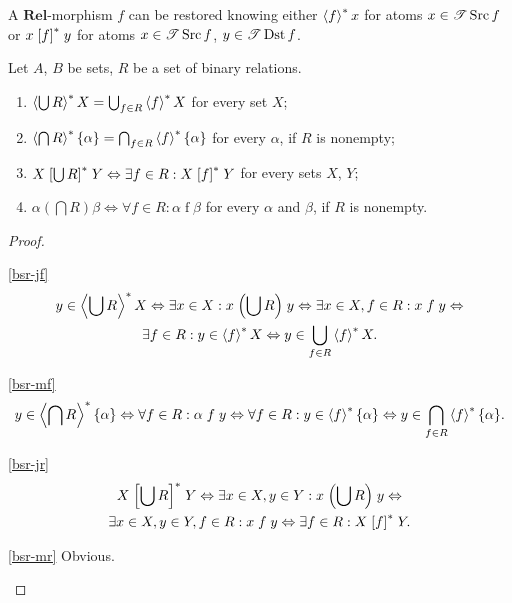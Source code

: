 \begin{cor}
A $\mathbf{Rel}$-morphism $f$ can be restored knowing either $\left\langle f\right\rangle ^{\ast}x$
for atoms $x\in\mathscr{T}\operatorname{Src} f$ or $x\mathrel{\left[f\right]^{\ast}}y$ for atoms $x\in\mathscr{T}\operatorname{Src} f$,
$y\in\mathscr{T}\operatorname{Dst} f$.\end{cor}
\begin{prop}
Let $A$, $B$ be sets, $R$ be a set of binary relations.
\begin{enumerate}
\item \textbf{\label{bsr-jf}$\left\langle \bigcup R\right\rangle ^{\ast}X=\bigcup_{f\in R}\left\langle f\right\rangle ^{\ast}X$}
for every set $X$;
\item \label{bsr-mf}$\left\langle \bigcap R\right\rangle ^{\ast}\{\alpha\}=\bigcap_{f\in R}\left\langle f\right\rangle ^{\ast}\{\alpha\}$
for every $\alpha$, if $R$ is nonempty;
\item \label{bsr-jr}$X\mathrel{\left[\bigcup R\right]^{\ast}}Y\Leftrightarrow\exists f\in R:X\mathrel{\left[f\right]^{\ast}}Y$
for every sets $X$, $Y$;
\item \label{bsr-mr}$\alpha\mathrel{\left(\bigcap R\right)}\beta\Leftrightarrow\forall f\in R:\alpha\mathrel f\beta$
for every $\alpha$ and $\beta$, if $R$ is nonempty.
\end{enumerate}
\end{prop}
\begin{proof}
~
\begin{widedisorder}
\item [{\ref{bsr-jf}}] ~
\begin{multline*}
y\in\left\langle \bigcup R\right\rangle ^{\ast}X\Leftrightarrow\exists x\in X:x\mathrel{\left(\bigcup R\right)}y\Leftrightarrow\exists x\in X,f\in R:x\mathrel fy\Leftrightarrow\\
\exists f\in R:y\in\left\langle f\right\rangle ^{\ast}X\Leftrightarrow y\in\bigcup_{f\in R}\left\langle f\right\rangle ^{\ast}X.
\end{multline*}

\item [{\ref{bsr-mf}}] ~ 
\[
y\in\left\langle \bigcap R\right\rangle ^{\ast}\{\alpha\}\Leftrightarrow\forall f\in R:\alpha\mathrel fy\Leftrightarrow\forall f\in R:y\in\left\langle f\right\rangle ^{\ast}\{\alpha\}\Leftrightarrow y\in\bigcap_{f\in R}\left\langle f\right\rangle ^{\ast}\{\alpha\}.
\]

\item [{\ref{bsr-jr}}] ~
\begin{multline*}
X\mathrel{\left[\bigcup R\right]^{\ast}}Y\Leftrightarrow\exists x\in X,y\in Y:x\mathrel{\left(\bigcup R\right)}y\Leftrightarrow\\
\exists x\in X,y\in Y,f\in R:x\mathrel fy\Leftrightarrow\exists f\in R:X\mathrel{\left[f\right]^{\ast}}Y.
\end{multline*}

\item [{\ref{bsr-mr}}] Obvious.
\end{widedisorder}
\end{proof}
